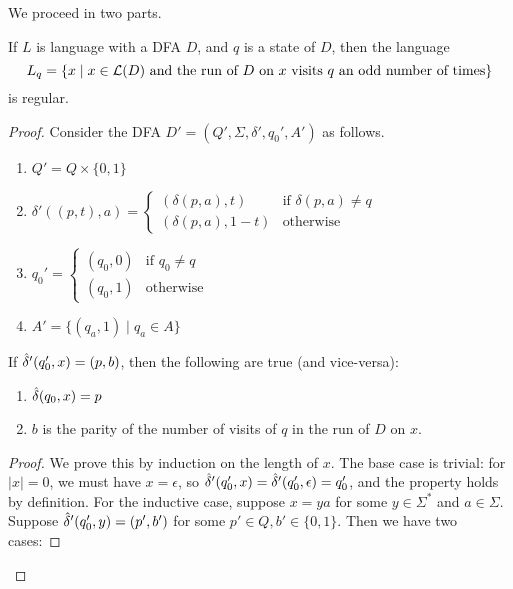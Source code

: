 \begin{soln}
    We proceed in two parts.

    \begin{claim}
        If $L$ is language with a DFA $D$, and $q$ is a state of $D$, then the language $$L_q = \{x \mid x \in \mathcal{L}(D) \text{ and the run of $D$ on $x$ visits $q$ an odd number of times}\}$$
        is regular.
    \end{claim}
    \begin{proof}
    Consider the DFA $D' = (Q', \Sigma, \delta', q_0', A')$ as follows.
    \begin{enumerate}
        \item $Q' = Q \times \{0, 1\}$
        \item $\delta'((p, t), a) = 
            \begin{cases}
                (\delta(p, a), t) & \text{if } \delta(p, a) \ne q\\
                (\delta(p, a), 1 - t) & \text{otherwise}
            \end{cases}
            $
        \item $q_0' = 
            \begin{cases}
                (q_0, 0) & \text{if } q_0 \ne q\\
                (q_0, 1) & \text{otherwise}
            \end{cases}
            $
        \item $A' = \{(q_a, 1) \mid q_a \in A\}$
    \end{enumerate}
    \begin{claim}
        If $\hat{\delta}'(q_0', x) = (p, b)$, then the following are true (and vice-versa):
        \begin{enumerate}
            \item $\hat{\delta}(q_0, x) = p$
            \item $b$ is the parity of the number of visits of $q$ in the run of $D$ on $x$.
        \end{enumerate}
    \end{claim}
    \begin{proof}
        We prove this by induction on the length of $x$. The base case is trivial: for $|x| = 0$, we must have $x = \epsilon$, so $\hat{\delta}'(q_0', x) = \hat{\delta}'(q_0', \epsilon) = q_0'$, and the property
        holds by definition.\nl
        For the inductive case, suppose $x = ya$ for some $y \in \Sigma^*$ and $a \in \Sigma$. Suppose $\hat{\delta}'(q_0', y) = (p', b')$ for some $p' \in Q, b' \in \{0, 1\}$.
        Then we have two cases:

\end{proof}
\end{proof}
\end{soln}
